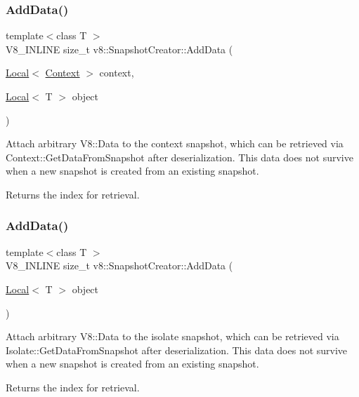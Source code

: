 \subsubsection{\texorpdfstring{Add\+Data()}{AddData()}\hspace{0.1cm}{\footnotesize\ttfamily [1/2]}}
{\footnotesize\ttfamily template$<$class T $>$ \\
V8\+\_\+\+I\+N\+L\+I\+NE size\+\_\+t v8\+::\+Snapshot\+Creator\+::\+Add\+Data (\begin{DoxyParamCaption}\item[{\mbox{\hyperlink{classv8_1_1Local}{Local}}$<$ \mbox{\hyperlink{classv8_1_1Context}{Context}} $>$}]{context,  }\item[{\mbox{\hyperlink{classv8_1_1Local}{Local}}$<$ T $>$}]{object }\end{DoxyParamCaption})}

Attach arbitrary V8\+::\+Data to the context snapshot, which can be retrieved via Context\+::\+Get\+Data\+From\+Snapshot after deserialization. This data does not survive when a new snapshot is created from an existing snapshot. \begin{DoxyReturn}{Returns}
the index for retrieval. 
\end{DoxyReturn}
\mbox{\label{classv8_1_1SnapshotCreator_a14522fba865a20f502805bc54104bee7}} 
\subsubsection{\texorpdfstring{Add\+Data()}{AddData()}\hspace{0.1cm}{\footnotesize\ttfamily [2/2]}}
{\footnotesize\ttfamily template$<$class T $>$ \\
V8\+\_\+\+I\+N\+L\+I\+NE size\+\_\+t v8\+::\+Snapshot\+Creator\+::\+Add\+Data (\begin{DoxyParamCaption}\item[{\mbox{\hyperlink{classv8_1_1Local}{Local}}$<$ T $>$}]{object }\end{DoxyParamCaption})}

Attach arbitrary V8\+::\+Data to the isolate snapshot, which can be retrieved via Isolate\+::\+Get\+Data\+From\+Snapshot after deserialization. This data does not survive when a new snapshot is created from an existing snapshot. \begin{DoxyReturn}{Returns}
the index for retrieval. 
\end{DoxyReturn}
\mbox{\label{classv8_1_1SnapshotCreator_aba2fdfb11dd2016a80fa9b812c1e4287}} 
